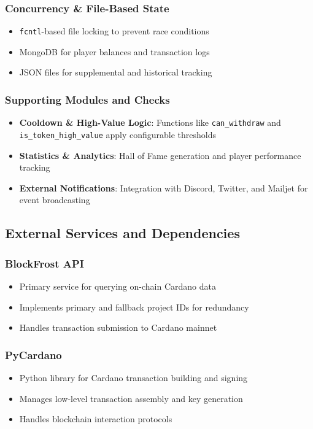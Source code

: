 \documentclass[11pt,a4paper]{article}
\begin{document}
\subsubsection{Concurrency \& File-Based State}
\begin{itemize}
    \item \texttt{fcntl}-based file locking to prevent race conditions
    \item MongoDB for player balances and transaction logs
    \item JSON files for supplemental and historical tracking
\end{itemize}

\subsubsection{Supporting Modules and Checks}
\begin{itemize}
    \item \textbf{Cooldown \& High-Value Logic}: Functions like \texttt{can\_withdraw} and \texttt{is\_token\_high\_value} apply configurable thresholds
    \item \textbf{Statistics \& Analytics}: Hall of Fame generation and player performance tracking
    \item \textbf{External Notifications}: Integration with Discord, Twitter, and Mailjet for event broadcasting
\end{itemize}

\subsection{External Services and Dependencies}

\subsubsection{BlockFrost API}
\begin{itemize}
    \item Primary service for querying on-chain Cardano data
    \item Implements primary and fallback project IDs for redundancy
    \item Handles transaction submission to Cardano mainnet
\end{itemize}

\subsubsection{PyCardano}
\begin{itemize}
    \item Python library for Cardano transaction building and signing
    \item Manages low-level transaction assembly and key generation
    \item Handles blockchain interaction protocols
\end{itemize}
\end{document}

